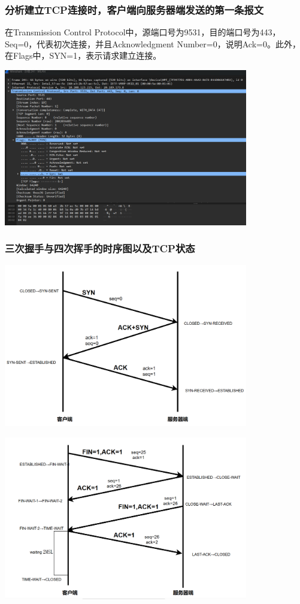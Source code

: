 \documentclass{article}
\begin{document}
\subsubsection{分析建立TCP连接时，客户端向服务器端发送的第一条报文}
在Transmission Control Protocol中，源端口号为9531，目的端口号为443，Seq=0，代表初次连接，并且Acknowledgment Number=0，说明Ack=0。此外，在Flags中，SYN=1，表示请求建立连接。

\vspace{10pt}
\centerline{\includegraphics[width=0.8\textwidth]{1_2_images/3.png}}
\vspace{10pt}

\subsubsection{三次握手与四次挥手的时序图以及TCP状态}

\vspace{10pt}
\centerline{\includegraphics[width=0.8\textwidth]{1_2_images/4.png}}
\vspace{10pt}

\vspace{10pt}
\centerline{\includegraphics[width=0.8\textwidth]{1_2_images/5.png}}
\vspace{10pt}
\end{document}
